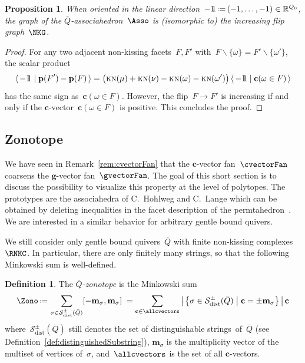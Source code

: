 \documentclass{amsart}
\newtheorem{proposition}[theorem]{Proposition}
\theoremstyle{definition}
\newtheorem{definition}[theorem]{Definition}
\newcommand{\R}{\mathbb{R}} %
\renewcommand{\b}[1]{\mathbf{#1}} %
\newcommand{\set}[2]{\left\{ #1 \;\middle|\; #2 \right\}} %
\newcommand{\ssm}{\smallsetminus} %
\newcommand{\dotprod}[2]{\left\langle \, #1 \; \middle| \; #2 \, \right\rangle} %
\newcommand{\one}{{1\!\!1}} %
\newcommand{\eqdef}{\mbox{\,\raisebox{0.2ex}{\scriptsize\ensuremath{\mathrm:}}\ensuremath{=}\,}} %
\newcommand{\darkblue}{\color{darkblue}} %
\newcommand{\defn}[1]{\textsl{\darkblue #1}} %
\newcommand{\distinguishableStrings}{\mathcal{S}_\mathrm{dist}} %
\newcommand{\KN}{\textsc{kn}} %
\newcommand{\cvector}[2]{\mathbf{c}(#1 \in #2)} %
\newcommand{\point}[1]{\mathbf{p}(#1)} %
\newcommand{\multiplicityVector}{\b{m}} %
\begin{document}
\begin{proposition}
When oriented in the linear direction~$-\one \eqdef (-1, \dots, -1) \in \R^{Q_0}$, the graph of the $\bar Q$-associahedron~$\Asso$ is (isomorphic to) the increasing flip graph~$\NKG$.
\end{proposition}

\begin{proof}
For any two adjacent non-kissing facets~$F,F'$ with~$F \ssm \{\omega\} = F' \ssm \{\omega'\}$, the scalar product
\[
\dotprod{-\one}{\point{F'} - \point{F}} = \big( \KN(\mu) + \KN(\nu) - \KN(\omega) - \KN(\omega') \big) \dotprod{-\one}{\cvector{\omega}{F}}
\]
has the same sign as~$\cvector{\omega}{F}$.
However, the flip~$F \to F'$ is increasing if and only if the \mbox{$\b{c}$-vector}~$\cvector{\omega}{F}$ is positive.
This concludes the proof.
\end{proof}

\subsection{Zonotope}
\label{subsec:zonotope}

We have seen in Remark~\ref{rem:cvectorFan} that the $\b{c}$-vector fan~$\cvectorFan$ coarsens the $\b{g}$-vector fan~$\gvectorFan$.
The goal of this short section is to discuss the possibility to visualize this property at the level of polytopes.
The prototypes are the associahedra of C.~Hohlweg and C.~Lange which can be obtained by deleting inequalities in the facet description of the permtahedron~\cite{HohlwegLange}.
We are interested in a similar behavior for arbitrary gentle bound quivers.

We still consider only gentle bound quivers~$\bar Q$ with finite non-kissing complexes~$\RNKC$.
In particular, there are only finitely many strings, so that the following Minkowski sum is \mbox{well-defined}.

\begin{definition}
The \defn{$\bar Q$-zonotope} is the Minkowski sum
\[
\Zono \eqdef \sum_{\sigma \in \distinguishableStrings^\pm(\bar Q)} [-\multiplicityVector_\sigma, \multiplicityVector_\sigma] \; = \sum_{\b{c} \in \allcvectors} \big|\set{\sigma \in \distinguishableStrings^\pm(\bar Q)}{\b{c} = \pm \multiplicityVector_\sigma} \big| \, \b{c}
\]
where~$\distinguishableStrings^\pm(\bar Q)$ still denotes the set of distinguishable strings~of~$\bar Q$ (see Definition~\ref{def:distinguishedSubstring}), $\multiplicityVector_\sigma$ is the multiplicity vector of the multiset of vertices of~$\sigma$, and~$\allcvectors$ is the set of all $\b{c}$-vectors.
\end{definition}
\end{document}

